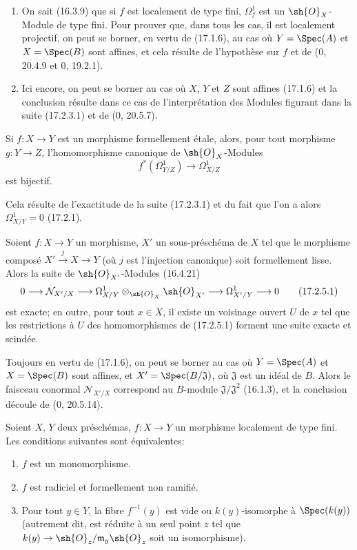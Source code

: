\begin{enumerate}
  \item[(i)] On sait (16.3.9) que si $f$ est localement de type fini, $\Omega_f^1$ est un $\sh{O}_X$-Module de type fini. Pour prouver que, dans tous les cas, il est localement projectif, on peut se borner, en vertu de (17.1.6), au cas où $Y=\Spec(A)$ et $X=\Spec(B)$ sont affines, et cela résulte de l'hypothèse sur $f$ et de (0, 20.4.9 et 0, 19.2.1).
  \item[(ii)] Ici encore, on peut se borner au cas où $X$, $Y$ et $Z$ sont affines (17.1.6) et la conclusion résulte dans ce cas de l'interprétation des Modules figurant dans la suite (17.2.3.1) et de (0, 20.5.7).
\end{enumerate}

\begin{corollary}[17.2.4]
\label{IV.17.2.4}
Si $f:X\to Y$ est un morphisme formellement étale, alors, pour tout morphisme $g:Y\to Z$, l'homomorphisme canonique de $\sh{O}_X$-Modules
\[
  f^*(\Omega_{Y/Z}^1)\longrightarrow\Omega_{X/Z}^1
\]
est bijectif.
\end{corollary}

Cela résulte de l'exactitude de la suite (17.2.3.1) et du fait que l'on a alors $\Omega_{X/Y}^1=0$ (17.2.1).

\begin{proposition}[17.2.5]
\label{IV.17.2.5}
Soient $f:X\to Y$ un morphisme, $X'$ un sous-préschéma de $X$ tel que le morphisme composé $X'\xrightarrow{j}X\to Y$ (où $j$ est l'injection canonique) soit formellement lisse. Alors la suite de $\sh{O}_{X'}$-Modules (16.4.21)
\[
\label{IV.17.2.5.1}
  0\longrightarrow\mathcal{N}_{X'/X}\longrightarrow\Omega_{X/Y}^1\otimes_{\sh{O}_X}\sh{O}_{X'}\longrightarrow\Omega_{X'/Y}^1\longrightarrow0
  \tag{17.2.5.1}
\]
est exacte; en outre, pour tout $x\in X$, il existe un voisinage ouvert $U$ de $x$ tel que les restrictions à $U$ des homomorphismes de (17.2.5.1) forment une suite exacte et scindée.
\end{proposition}

Toujours en vertu de (17.1.6), on peut se borner au cas où $Y=\Spec(A)$ et $X=\Spec(B)$ sont affines, et $X'=\Spec(B/\mathfrak{J})$, où $\mathfrak{J}$ est un idéal de $B$. Alors le faisceau conormal $\mathcal{N}_{X'/X}$ correspond au $B$-module $\mathfrak{J}/\mathfrak{J}^2$ (16.1.3), et la conclusion découle de (0, 20.5.14).

\begin{proposition}[17.2.6]
\label{IV.17.2.6}
Soient $X$, $Y$ deux préschémas, $f:X\to Y$ un morphisme localement de type fini. Les conditions suivantes sont équivalentes:
\begin{enumerate}
  \item[a)] $f$ est un monomorphisme.
  \item[b)] $f$ est radiciel et formellement non ramifié.
  \item[c)] Pour tout $y\in Y$, la fibre $f^{-1}(y)$ est vide ou $k(y)$-isomorphe à $\Spec(k(y))$ (autrement dit, est réduite à un seul point $z$ tel que $k(y)\to\sh{O}_z/\mathfrak{m}_y\sh{O}_z$ soit un isomorphisme).
\end{enumerate}
\end{proposition}

